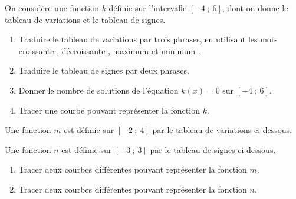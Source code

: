 \documentclass[10pt,a4paper]{article}
\begin{document}
\begin{bloc}
\begin{exo}[][appro]
On considère une fonction \(k\) définie sur l'intervalle \([-4\ ;\ 6]\), dont on donne le tableau de variations et le tableau de signes.

\begin{center}
\qquad
{}
\end{center}

\begin{enumerate}[leftmargin=*]
    \item Traduire le tableau de variations par trois phrases, en utilisant les mots \og croissante \fg{}, \og décroissante \fg{}, \og maximum \fg{} et \og minimum \fg{}.
    \item Traduire le tableau de signes par deux phrases.
    \item Donner le nombre de solutions de l'équation \(k(x)=0\) sur \([-4\ ;\ 6]\).
    \item Tracer une courbe pouvant représenter la fonction \(k\).
\end{enumerate}
\end{exo}
\end{bloc}

\begin{bloc}
\begin{exo}[][appro]
Une fonction \(m\) est définie sur \([-2\ ;\ 4]\) par le tableau de variations ci-dessous.

\begin{center}
\end{center}

Une fonction \(n\) est définie sur \([-3\ ;\ 3]\) par le tableau de signes ci-dessous.

\begin{center}
\end{center}

\begin{enumerate}[leftmargin=*]
    \item Tracer deux courbes différentes pouvant représenter la fonction \(m\).
    \item Tracer deux courbes différentes pouvant représenter la fonction \(n\).
\end{enumerate}
\end{exo}
\end{bloc}
\end{document}
